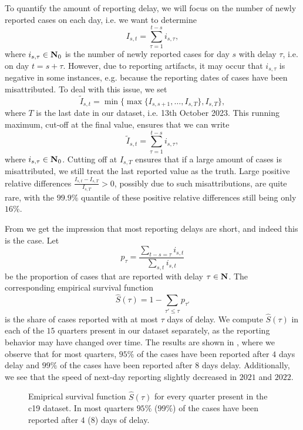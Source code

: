 To quantify the amount of reporting delay, we will focus on the number of newly reported cases on each day, i.e. we want to determine
$$
    I_{s,t} = \sum_{\tau = 1}^{t - s} i_{s,\tau},
$$
where $i_{s,\tau} \in \mathbf N_{0}$ is the number of newly reported cases for day $s$ with delay $\tau$, i.e. on day $t = s + \tau$. However, due to reporting artifacts, it may occur that $i_{s,\tau}$ is negative in some instances, e.g. because the reporting dates of cases have been misattributed. To deal with this issue, we set 
$$
    \tilde I_{s,t} = \min \{\max \{I_{s,s + 1}, \dots, I_{s, T}\}, I_{s, T}\},
$$
where $T$ is the last date in our dataset, i.e. 13th October 2023. This running maximum, cut-off at the final value, ensures that we can write 
$$
    \tilde I_{s,t} =  \sum_{\tau = 1}^{t - s} i_{s,\tau},
$$
where $i_{s,\tau} \in \mathbf N_0$. Cutting off at $I_{s,T}$ ensures that if a large amount of cases is misattributed, we still treat the last reported value as the truth. Large positive relative differences $ \frac{I_{s, t} - I_{s,T}}{I_{s,T}} > 0$, possibly due to such misattributions, are quite rare, with the $99.9\%$ quantile of these positive relative differences still being only $16\%$.

From  we get the impression that most reporting delays are short, and indeed this is the case. Let 
$$
    p_{\tau} = \frac{\sum_{t-s = \tau}i_{s,t}}{\sum_{s,t} i_{s,t}}
$$
be the proportion of cases that are reported with delay $\tau \in\mathbf N$. The corresponding empirical survival function 
$$
    \hat S(\tau) = 1 - \sum_{\tau' \leq \tau} p_{\tau'}
$$
is the share of cases reported with at most $\tau$ days of delay. We compute $\hat S(\tau)$ in each of the $15$ quarters present in our dataset separately, as the reporting behavior may have changed over time. The results are shown in , where we observe that for most quarters, $95\%$ of the cases have been reported after $4$ days delay and $99\%$ of the cases have been reported after $8$ days delay. 
Additionally, we see that the speed of next-day reporting slightly decreased in $2021$ and $2022$.

\begin{figure}
    \resizebox{\textwidth}{!}{%
    }
    \caption{Emiprical survival function $\hat S(\tau)$ for every quarter present in the \acrshort{c19} dataset. In most quarters $95\%$ ($99\%$) of the cases have been reported after $4$ ($8$) days of delay.}
    \label{fig:survival_function_rep_tri_incidences}
\end{figure}